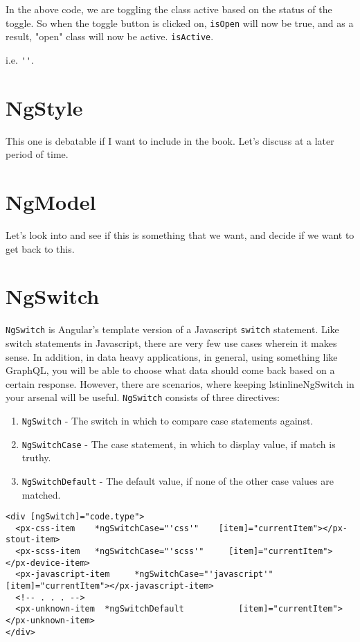 In the above code, we are toggling the class active based on the status of 
the toggle. So when the toggle button is clicked on, \lstinline{isOpen} will 
now be true, and as a result, "open" class will now be active. 
\lstinline{isActive}. 

 i.e. \lstinline{''}. 

 \section{ NgStyle }
This one is debatable if I want to include in the book. Let's discuss at a
later period of time. 

\section{ NgModel }
Let's look into and see if this is something that we want, and decide if we 
want to get back to this. 

\section{ NgSwitch }
\lstinline{NgSwitch} is Angular's template version of a Javascript 
\lstinline{switch} statement. Like switch statements in Javascript, there are 
very few use cases wherein it makes sense. In addition, in data heavy 
applications, in general, using something like GraphQL, you will be able to 
choose what data should come back based on a certain response. However, there 
are scenarios, where keeping lstinline{NgSwitch} in your arsenal will be 
useful. \lstinline{NgSwitch} consists of three directives: 
\begin{enumerate}
  \item \lstinline{NgSwitch} - The switch in which to compare case statements against. 
  \item \lstinline{NgSwitchCase} - The case statement, in which to display 
  value, if match is truthy. 
  \item \lstinline{NgSwitchDefault} - The default value, if none of the other
  case values are matched. 
\end{enumerate}

\begin{lstlisting}
<div [ngSwitch]="code.type">
  <px-css-item    *ngSwitchCase="'css'"    [item]="currentItem"></px-stout-item>
  <px-scss-item   *ngSwitchCase="'scss'"     [item]="currentItem"></px-device-item>
  <px-javascript-item     *ngSwitchCase="'javascript'"  [item]="currentItem"></px-javascript-item>
  <!-- . . . -->
  <px-unknown-item  *ngSwitchDefault           [item]="currentItem"></px-unknown-item>
</div>
\end{lstlisting}

